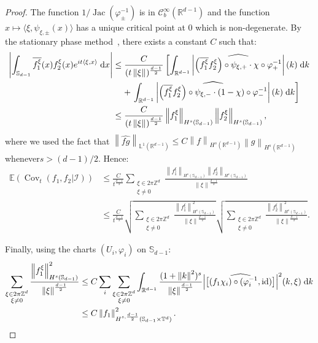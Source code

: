 \documentclass[AHL,Unicode,longabstracts]{cedram}
\DeclareMathOperator{\id}{id}
\DeclareMathOperator{\Cov}{Cov}
\DeclareMathOperator{\Jac}{Jac}
\newcommand{\Z}{\mathbb{Z}}
\newcommand{\R}{\mathbb{R}}
\newcommand{\Ebb}{\mathbb{E}}
\newcommand{\Lbb}{\mathbb{L}}
\newcommand{\Sbb}{\mathbb{S}}
\newcommand{\Tbb}{\mathbb{T}}
\newcommand{\Ccal}{\mathcal{C}}
\newcommand{\Ical}{\mathcal{I}}
\newcommand{\dd}{\;{\rm d}}
\newcommand{\norm}[2]{\left\| #1 \right\|_{#2}}
\begin{document}
\begin{proof}
The function $1/\Jac (\varphi_\pm^{-1})$ is in $\Ccal_b^\infty (\R^{d-1})$ and the function $x \mapsto \langle \xi, \psi_{\xi,\pm} (x) \rangle$ has a unique critical point at $0$ which is non-degenerate. By the stationary phase method~\cite[Chapter~7.7]{Hormander:1983}, there exists a constant $C$ such that:
\begin{align*}
\left| \int_{\Sbb_{d-1}} \overline{f_1^\xi} (x) f_2^\xi (x) e^{i t \langle \xi, x \rangle} \dd x \right| & \leq \frac{C}{(t \norm{\xi}{})^{\frac{d-1}{2}}} \left[\int_{\R^{d-1}} \left| \widehat{ \left(\overline{f_1^\xi} f_2^\xi\right) \circ \psi_{\xi, +} \cdot \chi \circ \varphi_+^{-1}} \right| (k) \dd k \right. \\
& \mkern 20mu + \left. \int_{\R^{d-1}} \left| \widehat{ \left(\overline{f_1^\xi} f_2^\xi\right) \circ \psi_{\xi, -} \cdot (1-\chi) \circ \varphi_-^{-1} } \right| (k) \dd k \right] \\
& \leq \frac{C}{(t \norm{\xi}{})^{\frac{d-1}{2}}} \norm{f_1^\xi}{H^s (\Sbb_{d-1})} \norm{f_2^\xi}{H^s (\Sbb_{d-1})},
\end{align*}
where we used the fact that $\norm{\widehat{fg}}{\Lbb^1 (\R^{d-1})} \leq C \norm{f}{H^s (\R^{d-1})} \norm{g}{H^s (\R^{d-1})}$ whenever\linebreak$s > (d-1)/2$. Hence:
\begin{align*}
\Ebb (\Cov_t (f_1, f_2|\Ical)) & \leq \frac{C}{t^{\frac{d-1}{2}}} \sum_{\substack{\xi \in 2\pi\Z^d \\ \xi \neq 0}} \frac{\norm{f_1^\xi}{H^s (\Sbb_{d-1})} \norm{f_2^\xi}{H^s (\Sbb_{d-1})}}{\norm{\xi}{}^{\frac{d-1}{2}}} \\
& \leq \frac{C}{t^{\frac{d-1}{2}}} \sqrt{\sum_{\substack{\xi \in 2\pi\Z^d \\ \xi \neq 0}} \frac{\norm{f_1^\xi}{H^s (\Sbb_{d-1})}^2 }{\norm{\xi}{}^{\frac{d-1}{2}}}} \sqrt{\sum_{\substack{\xi \in 2\pi\Z^d \\ \xi \neq 0}} \frac{\norm{f_2^\xi}{H^s (\Sbb_{d-1})}^2}{\norm{\xi}{}^{\frac{d-1}{2}}}}.
\end{align*}

Finally, using the charts $(U_i, \varphi_i)$ on $\Sbb_{d-1}$:
\begin{align*}
\sum_{\substack{\xi \in 2\pi\Z^d \\ \xi \neq 0}} \frac{\norm{f_1^\xi}{H^s (\Sbb_{d-1})}^2 }{\norm{\xi}{}^{\frac{d-1}{2}}} & \leq C \sum_i \sum_{\substack{\xi \in 2\pi\Z^d \\ \xi \neq 0}} \int_{\R^{d-1}} \frac{(1+\norm{k}{}^2)^s}{\norm{\xi}{}^{\frac{d-1}{2}}} \Big|\widehat{\left[(f_1\chi_i) \circ (\varphi_i^{-1}, \id)\right]}\Big|^2 (k, \xi) \dd k \\
& \leq C \norm{f_1}{H^{s,\frac{d-1}{2}} (\Sbb_{d-1} \times \Tbb^d)}^2.
\end{align*}


\end{proof}
\end{document}
